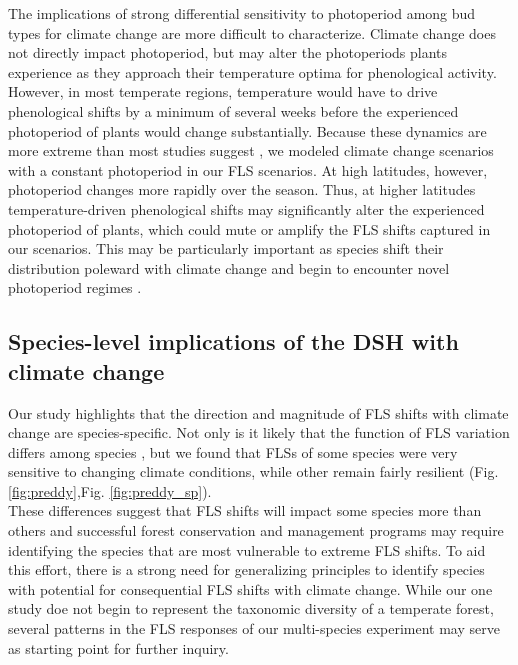 \documentclass[11pt]{article}\usepackage[]{graphicx}\usepackage[]{color}
\begin{document}
\noindent The implications of strong differential sensitivity to photoperiod among bud types for climate change are more difficult to characterize. Climate change does not directly impact photoperiod, but may alter the photoperiods plants experience as they approach their temperature optima for phenological activity. However, in most temperate regions, temperature would have to drive phenological shifts by a minimum of several weeks before the experienced photoperiod of plants would change substantially. %
Because these dynamics are more extreme than most studies suggest \citep{Thackeray:2016aa}, we modeled climate change scenarios with a constant photoperiod in our FLS scenarios. At high latitudes, however, photoperiod changes more rapidly over the season. Thus, at higher latitudes temperature-driven phenological shifts may significantly alter the experienced photoperiod of plants, which could mute or amplify the FLS shifts captured in our scenarios. This may be particularly important as species shift their distribution poleward with climate change and begin to encounter novel photoperiod regimes \citep{WAY:2015aa}.\\

\subsection*{Species-level implications of the DSH with climate change}
\noindent  Our study highlights that the direction and magnitude of FLS shifts with climate change are species-specific. Not only is it likely that the function of FLS variation differs among species \citep{Buonaiuto2020}, but we found that FLSs of some species were very sensitive to changing climate conditions, while other remain fairly resilient (Fig. \ref{fig:preddy},Fig. \ref{fig:preddy_sp}).\\

\noident These differences suggest that FLS shifts will impact some species more than others and successful forest conservation and management programs may require identifying the species that are most vulnerable to extreme FLS shifts. To aid this effort, there is a strong need for generalizing principles to identify species with potential for consequential FLS shifts with climate change. While our one study doe not begin to represent the taxonomic diversity of a temperate forest, several patterns in the FLS responses of our multi-species experiment may serve as starting point for further inquiry.\\ 
\end{document}
